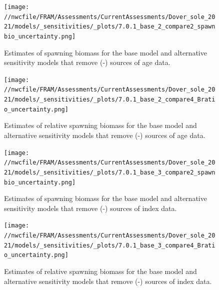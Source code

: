 \documentclass[11pt,
  english,
  a4paper,
]{article}
\begin{document}
\begin{figure}
\centering
\texttt{[image: //nwcfile/FRAM/Assessments/CurrentAssessments/Dover\_sole\_2021/models/\_sensitivities/\_plots/7.0.1\_base\_2\_compare2\_spawnbio\_uncertainty.png]}
\caption{Estimates of spawning biomass for the base model and alternative sensitivity models that remove (-) sources of age data.\label{fig:sens-age-ssb}}
\end{figure}

\tagmcend\tagstructend


\begin{figure}
\centering
\texttt{[image: //nwcfile/FRAM/Assessments/CurrentAssessments/Dover\_sole\_2021/models/\_sensitivities/\_plots/7.0.1\_base\_2\_compare4\_Bratio\_uncertainty.png]}
\caption{Estimates of relative spawning biomass for the base model and alternative sensitivity models that remove (-) sources of age data.\label{fig:sens-age-relssb}}
\end{figure}

\tagmcend\tagstructend


\begin{figure}
\centering
\texttt{[image: //nwcfile/FRAM/Assessments/CurrentAssessments/Dover\_sole\_2021/models/\_sensitivities/\_plots/7.0.1\_base\_3\_compare2\_spawnbio\_uncertainty.png]}
\caption{Estimates of spawning biomass for the base model and alternative sensitivity models that remove (-) sources of index data.\label{fig:sens-index-ssb}}
\end{figure}

\tagmcend\tagstructend


\begin{figure}
\centering
\texttt{[image: //nwcfile/FRAM/Assessments/CurrentAssessments/Dover\_sole\_2021/models/\_sensitivities/\_plots/7.0.1\_base\_3\_compare4\_Bratio\_uncertainty.png]}
\caption{Estimates of relative spawning biomass for the base model and alternative sensitivity models that remove (-) sources of index data.\label{fig:sens-index-relssb}}
\end{figure}
\end{document}
